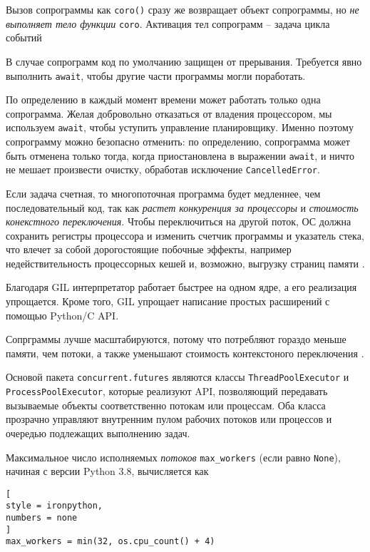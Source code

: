 \documentclass[%
	11pt,
	a4paper,
	utf8,
		]{article}
\begin{document}
{\color{red}
Вызов сопрограммы как \verb*|coro()| сразу же возвращает объект сопрограммы, но \emph{не выполняет тело функции} \verb|coro|. Активация тел сопрограмм -- задача цикла событий
}

В случае сопрограмм код по умолчанию защищен от прерывания. Требуется явно выполнить \verb*|await|, чтобы другие части программы могли поработать.

По определению в каждый момент времени может работать только одна сопрограмма. Желая добровольно отказаться от владения процессором, мы используем \verb|await|, чтобы уступить управление планировщику. Именно поэтому сопрограмму можно безопасно отменить: по определению, сопрограмма может быть отменена только тогда, когда приостановлена в выражении \verb*|await|, и ничто не мешает произвести очистку, обработав исключение \verb|CancelledError|.

Если задача счетная, то многопоточная программа будет медленнее, чем последовательный код, так как \emph{растет конкуренция за процессоры} и \emph{стоимость конекстного переключения}. Чтобы переключиться на другой поток, ОС должна сохранить регистры процессора и изменить счетчик программы и указатель стека, что влечет за собой дорогостоящие побочные эффекты, например недействительность процессорных кешей и, возможно, выгрузку страниц памяти \cite[]{ramalho:python-2022}.

Благодаря GIL интерпретатор работает быстрее на одном ядре, а его реализация упрощается. Кроме того, GIL упрощает написание простых расширений с помощью Python/C API.

Сопрграммы лучше масштабируются, потому что потребляют гораздо меньше памяти, чем потоки, а также уменьшают стоимость контекстоного переключения \cite[]{ramalho:python-2022}.

Основой пакета \verb|concurrent.futures| являются классы \verb*|ThreadPoolExecutor| и \verb|ProcessPoolExecutor|, которые реализуют API, позволяющий передавать вызываемые объекты соответственно потокам или процессам. Оба класса прозрачно управляют внутренним пулом рабочих потоков или процессов и очередью подлежащих выполнению задач.

Максимальное число исполняемых \emph{потоков} \verb*|max_workers| (если равно \verb|None|), начиная с версии Python 3.8, вычисляется как \cite[]{ramalho:python-2022}
\begin{lstlisting}[
style = ironpython,
numbers = none
]
max_workers = min(32, os.cpu_count() + 4)
\end{lstlisting}
\end{document}
